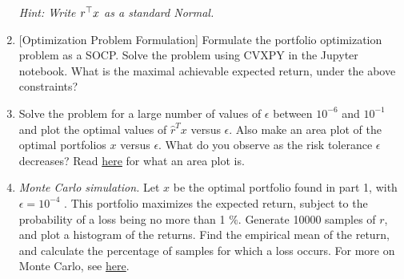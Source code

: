 \begin{enumerate}
\emph{Hint: Write $r^{\top} x$ as a standard Normal.}

\newline
\sol{}
\newline

\item {[Optimization Problem Formulation]} Formulate the portfolio optimization problem as a SOCP.
Solve the problem using CVXPY in the Jupyter notebook. What is the maximal achievable expected return, under the above constraints? \\



\newline
\sol{}
\newline

\item Solve the problem for a large number of values of $\epsilon$ between $10^{-6}$ and $10^{-1}$ and plot the optimal values of $\hat{r}^Tx$ versus $\epsilon$.   Also make an area plot of the optimal portfolios $x$ versus $\epsilon$. What do you observe as the risk tolerance $\epsilon$ decreases? Read  \href{https://en.wikipedia.org/wiki/Area_chart}{\color{blue} here} for what an area plot is. 

\newline
\sol{}
\newline

\item \textit{Monte Carlo simulation.} Let $x$ be the optimal portfolio found in part 1, with $\epsilon = 10^{-4}$ . This portfolio maximizes the expected return, subject to the probability of a loss being no more than 1 $\%$. Generate 10000 samples of $r$, and plot a histogram of the returns. Find the empirical mean of the return, and calculate the percentage of samples for which a loss occurs. For more on Monte Carlo, see \href{https://en.wikipedia.org/wiki/Monte_Carlo_method}{\color{blue} here}.

\newline
\sol{}
\newline

\end{enumerate}

